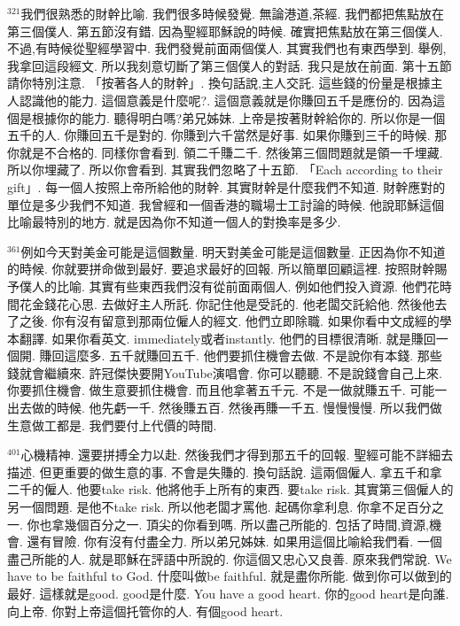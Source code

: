 \documentclass{book}
\begin{document}
$^{321}$我們很熟悉的財幹比喻.
我們很多時候發覺.
無論港道,茶經.
我們都把焦點放在第三個僕人.
第五節沒有錯.
因為聖經耶穌說的時候.
確實把焦點放在第三個僕人.
不過,有時候從聖經學習中.
我們發覺前面兩個僕人.
其實我們也有東西學到.
舉例,我拿回這段經文.
所以我刻意切斷了第三個僕人的對話.
我只是放在前面.
第十五節請你特別注意.
「按著各人的財幹」.
換句話說,主人交託.
這些錢的份量是根據主人認識他的能力.
這個意義是什麼呢?.
這個意義就是你賺回五千是應份的.
因為這個是根據你的能力.
聽得明白嗎?弟兄姊妹.
上帝是按著財幹給你的.
所以你是一個五千的人.
你賺回五千是對的.
你賺到六千當然是好事.
如果你賺到三千的時候.
那你就是不合格的.
同樣你會看到.
領二千賺二千.
然後第三個問題就是領一千埋藏.
所以你埋藏了.
所以你會看到.
其實我們忽略了十五節.
「Each according to their gift」.
每一個人按照上帝所給他的財幹.
其實財幹是什麼我們不知道.
財幹應對的單位是多少我們不知道.
我曾經和一個香港的職場士工討論的時候.
他說耶穌這個比喻最特別的地方.
就是因為你不知道一個人的對換率是多少.

$^{361}$例如今天對美金可能是這個數量.
明天對美金可能是這個數量.
正因為你不知道的時候.
你就要拼命做到最好.
要追求最好的回報.
所以簡單回顧這裡.
按照財幹賜予僕人的比喻.
其實有些東西我們沒有從前面兩個人.
例如他們投入資源.
他們花時間花金錢花心思.
去做好主人所託.
你記住他是受託的.
他老闆交託給他.
然後他去了之後.
你有沒有留意到那兩位僱人的經文.
他們立即除職.
如果你看中文成經的學本翻譯.
如果你看英文.
immediately或者instantly.
他們的目標很清晰.
就是賺回一個開.
賺回這麼多.
五千就賺回五千.
他們要抓住機會去做.
不是說你有本錢.
那些錢就會繼續來.
許冠傑快要開YouTube演唱會.
你可以聽聽.
不是說錢會自己上來.
你要抓住機會.
做生意要抓住機會.
而且他拿著五千元.
不是一做就賺五千.
可能一出去做的時候.
他先虧一千.
然後賺五百.
然後再賺一千五.
慢慢慢慢.
所以我們做生意做工都是.
我們要付上代價的時間.

$^{401}$心機精神.
還要拼搏全力以赴.
然後我們才得到那五千的回報.
聖經可能不詳細去描述.
但更重要的做生意的事.
不會是失賺的.
換句話說.
這兩個僱人.
拿五千和拿二千的僱人.
他要take risk.
他將他手上所有的東西.
要take risk.
其實第三個僱人的另一個問題.
是他不take risk.
所以他老闆才罵他.
起碼你拿利息.
你拿不足百分之一.
你也拿幾個百分之一.
頂尖的你看到嗎.
所以盡己所能的.
包括了時間,資源,機會.
還有冒險.
你有沒有付盡全力.
所以弟兄姊妹.
如果用這個比喻給我們看.
一個盡己所能的人.
就是耶穌在評語中所說的.
你這個又忠心又良善.
原來我們常說.
We have to be faithful to God.
什麼叫做be faithful.
就是盡你所能.
做到你可以做到的最好.
這樣就是good.
good是什麼.
You have a good heart.
你的good heart是向誰.
向上帝.
你對上帝這個托管你的人.
有個good heart.
\end{document}
